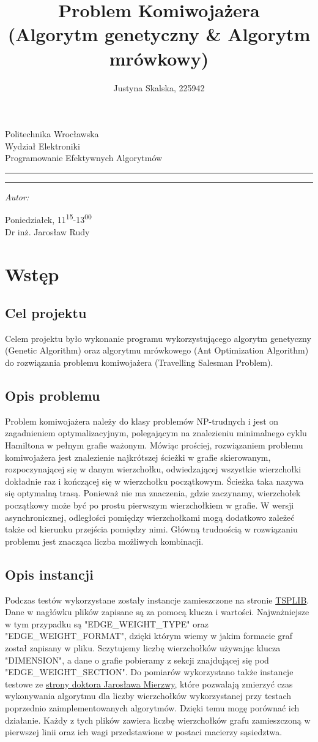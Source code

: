 \documentclass[12pt,a4paper,titlepage]{article}
\author{Justyna Skalska, 225942}
\title{Problem Komiwojażera\\
\large{(Algorytm genetyczny \& Algorytm mrówkowy)}}
\makeatletter
\newcommand{\linia}{\rule{\linewidth}{0.4mm}}
\renewcommand{\maketitle}{\begin{titlepage}
    \vspace*{1cm}
    \begin{center}\small
    Politechnika Wrocławska\\
    Wydział Elektroniki\\
    Programowanie Efektywnych Algorytmów
    \end{center}
    \vspace{3cm}
    \noindent\linia
    \begin{center}
      \LARGE \textsc{\@title}
         \end{center}
     \linia
    \vspace{0.5cm}
    \begin{flushright}
    \begin{minipage}{7cm}
    \textit{\small Autor:}\\
    \normalsize \textsc{\@author} \par
    \end{minipage}
    \vspace{5cm}

     {\small Poniedziałek, 11\textsuperscript{15}-13\textsuperscript{00}}\\
        Dr inż. Jarosław Rudy
     \end{flushright}
    \vspace*{\stretch{6}}
    \begin{center}
    \@date
    \end{center}
  \end{titlepage}
}
\makeatother
\begin{document}
\maketitle
\tableofcontents

\newpage

\section{Wstęp}
\subsection{Cel projektu}
Celem projektu było wykonanie programu wykorzystującego algorytm genetyczny (Genetic Algorithm) oraz algorytmu mrówkowego (Ant Optimization Algorithm) do rozwiązania problemu komiwojażera (Travelling Salesman Problem).

\subsection{Opis problemu}
Problem komiwojażera należy do klasy problemów NP-trudnych i jest on zagadnieniem optymalizacyjnym, polegającym na znalezieniu minimalnego cyklu Hamiltona w pełnym grafie ważonym. Mówiąc prościej, rozwiązaniem problemu komiwojażera jest znalezienie najkrótszej ścieżki w grafie skierowanym, rozpoczynającej się w danym wierzchołku, odwiedzającej wszystkie wierzchołki dokładnie raz i kończącej się w wierzchołku początkowym. Ścieżka taka nazywa się optymalną trasą. Ponieważ nie ma znaczenia, gdzie zaczynamy, wierzchołek początkowy może być po prostu pierwszym wierzchołkiem w grafie. W wersji asynchronicznej, odległości pomiędzy wierzchołkami mogą dodatkowo zależeć także od kierunku przejścia pomiędzy nimi. Główną trudnością w rozwiązaniu problemu jest znacząca liczba możliwych kombinacji.

\subsection{Opis instancji}
Podczas testów wykorzystane zostały instancje zamieszczone na stronie \newline \href{https://www.iwr.uni-heidelberg.de/groups/comopt/software/TSPLIB95/}{TSPLIB}. Dane w nagłówku plików zapisane są za pomocą klucza i wartości. Najważniejsze w tym przypadku są "EDGE\_WEIGHT\_TYPE" oraz "EDGE\_WEIGHT\_FORMAT", dzięki którym wiemy w jakim formacie graf został zapisany w pliku. Sczytujemy liczbę wierzchołków używając klucza "DIMENSION", a dane o grafie pobieramy z sekcji znajdującej się pod "EDGE\_WEIGHT\_SECTION". Do pomiarów wykorzystano także instancje testowe ze \href{http://jaroslaw.mierzwa.staff.iiar.pwr.wroc.pl/pea-stud/tsp/}{strony doktora Jarosława Mierzwy}, które pozwalają zmierzyć czas wykonywania algorytmu dla liczby wierzchołków wykorzystanej przy testach poprzednio zaimplementowanych algorytmów. Dzięki temu mogę porównać ich działanie. Każdy z tych plików zawiera liczbę wierzchołków grafu zamieszczoną w pierwszej linii oraz ich wagi przedstawione w postaci macierzy sąsiedztwa.
\end{document}
